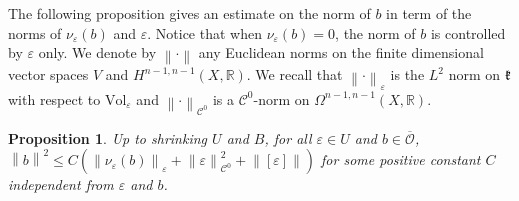 \documentclass{article}
\newtheorem{proposition}[theorem]{Proposition}
\theoremstyle{remark}
\theoremstyle{definition}
\newcommand{\R}{\mathbb{R}}
\newcommand{\Vol}{\mathrm{Vol}}
\newcommand{\norme}[1]{\left\| #1 \right\|}
\newcommand{\mC}{\mathcal{C}}
\renewcommand{\leq}{\leqslant}
\begin{document}
The following proposition gives an estimate on the norm of $b$ in term of the norms of $\nu_\varepsilon(b)$ and $\varepsilon$. Notice that when $\nu_\varepsilon(b) = 0$, the norm of $b$ is controlled by $\varepsilon$ only. We denote by $\norme{\cdot}$ any Euclidean norms on the finite dimensional vector spaces $V$ and $H^{n - 1,n - 1}(X,\R)$. We recall that $\norme{\cdot}_\varepsilon$ is the $L^2$ norm on $\frak{k}$ with respect to $\Vol_\varepsilon$ and $\norme{\cdot}_{\mC^0}$ is a $\mC^0$-norm on $\Omega^{n - 1,n - 1}(X,\R)$.

\begin{proposition}\label{PRO:Inégalité norme b}
    Up to shrinking $U$ and $B$, for all $\varepsilon \in U$ and $b \in \overline{\mathcal{O}}$, $\norme{b}^2 \leq C(\norme{\nu_\varepsilon(b)}_\varepsilon + \norme{\varepsilon}_{\mC^0}^2 + \norme{[\varepsilon]})$ for some positive constant $C$ independent from $\varepsilon$ and $b$.
\end{proposition}
\end{document}
